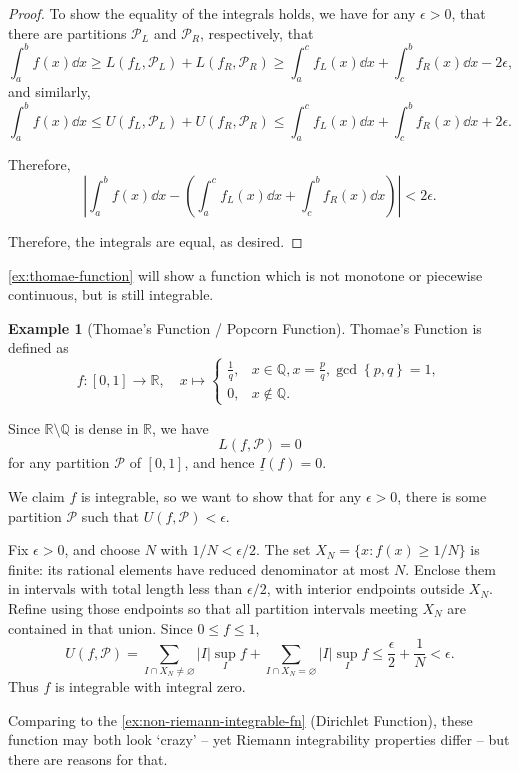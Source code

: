\documentclass[11pt]{article}
\numberwithin{equation}{section}
\theoremstyle{definition}
\newtheorem{example}[theorem]{Example}
\theoremstyle{remark}
\newcommand{\pqty}[1]{\left(#1\right)}
\newcommand{\Bqty}[1]{\left\{#1\right\}}
\newcommand{\abs}[1]{\left|#1\right|}
\newcommand{\ccintv}[2]{[#1,#2]}
\newcommand{\function}[5]{#1:#2\to #3,\quad #4\mapsto #5}
\newcommand{\RR}{\mathbb R}
\newcommand{\QQ}{\mathbb Q}
\newcommand{\partition}{\mathcal P}
\newcommand{\upperSum}{U}
\newcommand{\lowerSum}{L}
\newcommand{\lowerI}{\underline I}
\begin{document}
\begin{proof}
    To show the equality of the integrals holds, we have for any \(\epsilon > 0\), that there are partitions \(\partition_L\) and \(\partition_R\), respectively, that
    \[
        \int_{a}^{b} f\pqty{x} \dd{x} \geq \lowerSum\pqty{f_L, \partition_L} + \lowerSum\pqty{f_R, \partition_R} \geq \int_{a}^{c} f_L\pqty{x} \dd{x} + \int_{c}^{b} f_R\pqty{x} \dd{x} - 2\epsilon,
    \]
    and similarly,
    \[
        \int_{a}^{b} f\pqty{x} \dd{x} \leq \upperSum\pqty{f_L, \partition_L} + \upperSum\pqty{f_R, \partition_R} \leq \int_{a}^{c} f_L\pqty{x} \dd{x} + \int_{c}^{b} f_R\pqty{x} \dd{x} + 2\epsilon.
    \]

    Therefore,
    \[
        \abs{\int_{a}^{b} f\pqty{x} \dd{x} - \pqty{\int_{a}^{c} f_L\pqty{x} \dd{x} + \int_{c}^{b} f_R\pqty{x} \dd{x}}} < 2 \epsilon.
    \]

    Therefore, the integrals are equal, as desired.
\end{proof}

\autoref{ex:thomae-function} will show a function which is not monotone or piecewise continuous, but is still integrable.

\begin{example}[Thomae's Function / Popcorn Function]\label{analysis-unit-0156}
    \label{ex:thomae-function}%
    Thomae's Function is defined as
    \[
        \function{f}{\ccintv{0}{1}}{\RR}{x}{\begin{cases}
            \frac{1}{q}, & x \in \QQ, x = \frac{p}{q}, \gcd\Bqty{p, q} = 1, \\
            0, & x \notin \QQ.
        \end{cases}}
    \]

    Since \(\RR \setminus \QQ\) is dense in \(\RR\), we have
    \[
        \lowerSum\pqty{f, \partition} = 0
    \]
    for any partition \(\partition\) of \(\ccintv{0}{1}\), and hence \(\lowerI\pqty{f} = 0\).

    We claim \(f\) is integrable, so we want to show that for any \(\epsilon > 0\), there is some partition \(\partition\) such that \(\upperSum\pqty{f, \partition} < \epsilon\).

    Fix \(\epsilon>0\), and choose \(N\) with \(1/N<\epsilon/2\).
The set \(X_N=\{x:f(x)\ge1/N\}\) is finite: its rational elements have reduced
denominator at most \(N\). Enclose them in intervals with total length less
than \(\epsilon/2\), with interior endpoints outside \(X_N\). Refine using those
endpoints so that all partition intervals meeting \(X_N\) are contained in
that union. Since \(0\le f\le1\),
\[
U(f,\partition)
=\sum_{I\cap X_N\ne\varnothing}|I|\sup_I f+
 \sum_{I\cap X_N=\varnothing}|I|\sup_I f
\le\frac\epsilon2+\frac1N<\epsilon.
\]
Thus \(f\) is integrable with integral zero.

    Comparing to the \autoref{ex:non-riemann-integrable-fn} (Dirichlet Function), these function may both look `crazy' -- yet Riemann integrability properties differ -- but there are reasons for that.
\end{example}
\end{document}
